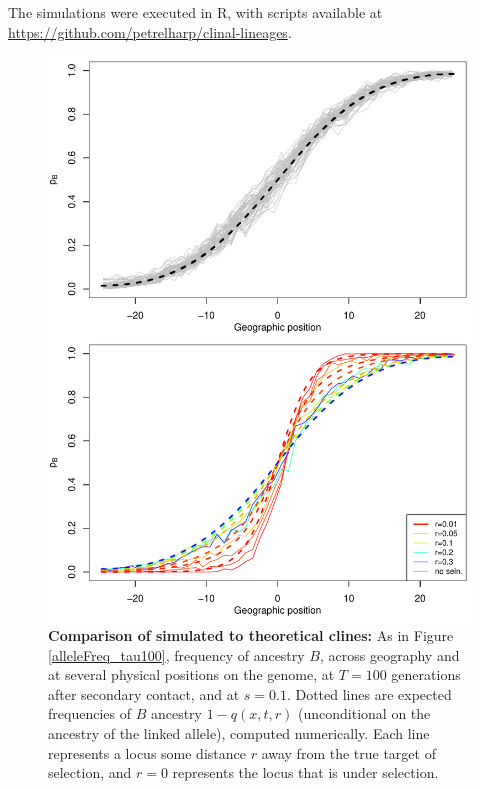 \documentclass[11pt,letterpaper]{article}
\begin{document}
The simulations were executed in R, with scripts available at
\url{https://github.com/petrelharp/clinal-lineages}.

\begin{figure}
\includegraphics{figs/alleleFrequencies_sim_comparison_revision_original.pdf}
    \caption{
        \textbf{Comparison of simulated to theoretical clines:}
        As in Figure \ref{alleleFreq_tau100},
        frequency of ancestry $B$,
        across geography and at several physical positions on the genome,
        at $T=100$ generations after secondary contact,
        and at $s=0.1$.
        Dotted lines are expected frequencies of $B$ ancestry $1-q(x,t,r)$
        (unconditional on the ancestry of the linked allele), computed numerically.
        Each line represents a locus some distance $r$ away from the true target of selection, 
        and $r=0$ represents the locus that is under selection.    
    }\label{sfig:alleleFreq_tau100_comparison}
\end{figure}
\end{document}
